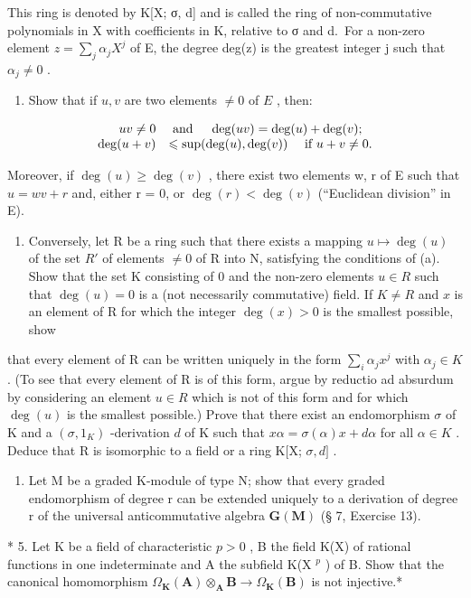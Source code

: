 This ring is denoted by K{[}X; σ, d{]} and is called the ring of non-commutative polynomials in X with coefficients in K, relative to σ and d.~For a non-zero element \(z = \sum_{j} \alpha_{j} X^{j}\) of E, the degree deg(z) is the greatest integer j such that \(\alpha_{j} \neq 0\) .

\begin{enumerate}
\def\labelenumi{(\alph{enumi})}
\tightlist
\item
  Show that if \(u, v\) are two elements \(\neq 0\) of \(E\) , then:
\end{enumerate}

\[
\begin{array}{r l} u v \neq 0 & \text { and } \quad \deg (u v) = \deg (u) + \deg (v); \\ \deg (u + v) & \leqslant \sup (\deg (u), \deg (v)) \quad \text { if } u + v \neq 0. \end{array}
\]

Moreover, if \(\deg(u) \geqslant \deg(v)\) , there exist two elements w, r of E such that \(u = wv + r\) and, either r = 0, or \(\deg(r) < \deg(v)\) (``Euclidean division'' in E).

\begin{enumerate}
\def\labelenumi{(\alph{enumi})}
\setcounter{enumi}{1}
\tightlist
\item
  Conversely, let R be a ring such that there exists a mapping \(u \mapsto \deg(u)\) of the set \(R'\) of elements \(\neq 0\) of R into N, satisfying the conditions of (a). Show that the set K consisting of 0 and the non-zero elements \(u \in R\) such that \(\deg(u) = 0\) is a (not necessarily commutative) field. If \(K \neq R\) and \(x\) is an element of R for which the integer \(\deg(x) > 0\) is the smallest possible, show
\end{enumerate}

that every element of R can be written uniquely in the form \(\sum_{i} \alpha_j x^j\) with \(\alpha_j \in K\) . (To see that every element of R is of this form, argue by reductio ad absurdum by considering an element \(u \in R\) which is not of this form and for which \(\deg(u)\) is the smallest possible.) Prove that there exist an endomorphism \(\sigma\) of K and a \((\sigma, 1_K)\) -derivation \(d\) of K such that \(x\alpha = \sigma(\alpha)x + d\alpha\) for all \(\alpha \in K\) . Deduce that R is isomorphic to a field or a ring K{[}X; \(\sigma, d]\) .

\begin{enumerate}
\def\labelenumi{\arabic{enumi}.}
\setcounter{enumi}{3}
\tightlist
\item
  Let M be a graded K-module of type N; show that every graded endomorphism of degree r can be extended uniquely to a derivation of degree r of the universal anticommutative algebra \(\mathbf{G}(\mathbf{M})\) (§ 7, Exercise 13).
\end{enumerate}

* 5. Let K be a field of characteristic \(p > 0\) , B the field K(X) of rational functions in one indeterminate and A the subfield K(X \(^{p}\) ) of B. Show that the canonical homomorphism \(\Omega_{\mathbf{K}}(\mathbf{A}) \otimes_{\mathbf{A}} \mathbf{B} \to \Omega_{\mathbf{K}}(\mathbf{B})\) is not injective.*

